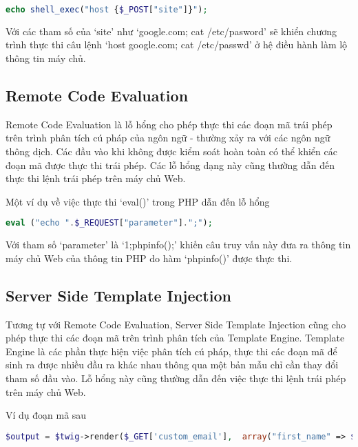 \documentclass[./../main.tex]{subfiles}
\begin{document}
\begin{lstlisting}[language=php, caption=Lỗ hổng OS Command Injection]
    echo shell_exec("host {$_POST["site"]}");
\end{lstlisting}

Với các tham số của `site' như `google.com; cat /etc/pasword' sẽ khiển chương trình thực thi câu lệnh `host google.com; cat /etc/passwd' ở hệ điều hành làm lộ thông tin máy chủ.

\subsection{Remote Code Evaluation}
Remote Code Evaluation là lỗ hổng cho phép thực thi các đoạn mã trái phép trên trình phân tích cú pháp của ngôn ngữ - thường xảy ra với các ngôn ngữ thông dịch. Các đầu vào khi không được kiểm soát hoàn toàn có thể khiển các đoạn mã được thực thi trái phép. Các lỗ hổng dạng này cũng thường dẫn đến thực thi lệnh trái phép trên máy chủ Web.

Một ví dụ về việc thực thi `eval()' trong PHP dẫn đến lỗ hổng

\begin{lstlisting}[language=php, caption=Lỗ hổng Remote Code Evaluation]
    eval ("echo ".$_REQUEST["parameter"].";");
\end{lstlisting}

Với tham số `parameter' là `1;phpinfo();' khiến câu truy vấn này đưa ra thông tin máy chủ Web của thông tin PHP do hàm `phpinfo()' được thực thi.

\subsection{Server Side Template Injection}
Tương tự với Remote Code Evaluation, Server Side Template Injection cũng cho phép thực thi các đoạn mã trên trình phân tích của Template Engine. Template Engine là các phần thực hiện việc phân tích cú pháp, thực thi các đoạn mã để sinh ra được nhiều đầu ra khác nhau thông qua một bản mẫu chỉ cần thay đổi tham số đầu vào. Lỗ hổng này cũng thường dẫn đến việc thực
thi lệnh trái phép trên máy chủ Web.

Ví dụ đoạn mã sau

\begin{lstlisting}[language=php, caption=Lỗ hổng Server Side Template Injection]
    $output = $twig->render($_GET['custom_email'],  array("first_name" => $user.first_name) );
\end{lstlisting}
\end{document}
